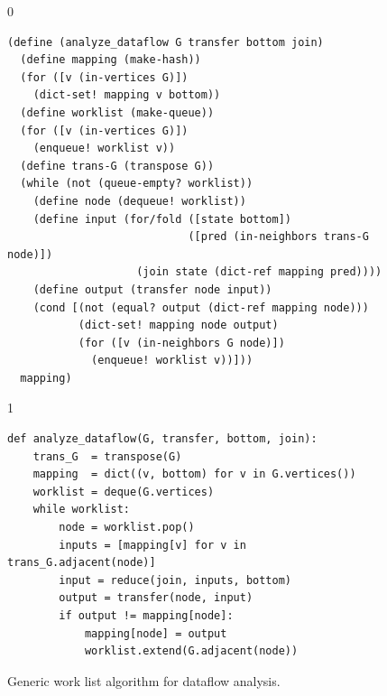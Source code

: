 \documentclass[7x10]{TimesAPriori_MIT}%
\def\racketEd{0}
\def\pythonEd{1}
\def\edition{1}
\newcommand{\pythonColor}[0]{}
\numberwithin{theorem}{chapter}
\numberwithin{definition}{chapter}
\numberwithin{equation}{chapter}
\begin{document}
\begin{figure}[tb]
\begin{tcolorbox}[colback=white]  
{\if\edition\racketEd    
\begin{lstlisting}
(define (analyze_dataflow G transfer bottom join)
  (define mapping (make-hash))
  (for ([v (in-vertices G)])
    (dict-set! mapping v bottom))
  (define worklist (make-queue))
  (for ([v (in-vertices G)])
    (enqueue! worklist v))
  (define trans-G (transpose G))
  (while (not (queue-empty? worklist))
    (define node (dequeue! worklist)) 
    (define input (for/fold ([state bottom])
                            ([pred (in-neighbors trans-G node)])
                    (join state (dict-ref mapping pred))))
    (define output (transfer node input))
    (cond [(not (equal? output (dict-ref mapping node)))
           (dict-set! mapping node output)
           (for ([v (in-neighbors G node)])
             (enqueue! worklist v))]))
  mapping)
\end{lstlisting}
\fi}
{\if\edition\pythonEd\pythonColor
\begin{lstlisting}
def analyze_dataflow(G, transfer, bottom, join):
    trans_G  = transpose(G)
    mapping  = dict((v, bottom) for v in G.vertices())
    worklist = deque(G.vertices)
    while worklist:
        node = worklist.pop()
        inputs = [mapping[v] for v in trans_G.adjacent(node)]
        input = reduce(join, inputs, bottom)
        output = transfer(node, input)
        if output != mapping[node]:
            mapping[node] = output
            worklist.extend(G.adjacent(node))
\end{lstlisting}
\fi}
\end{tcolorbox}

\caption{Generic work list algorithm for dataflow analysis.}
  \label{fig:generic-dataflow}
\end{figure}
\end{document}
